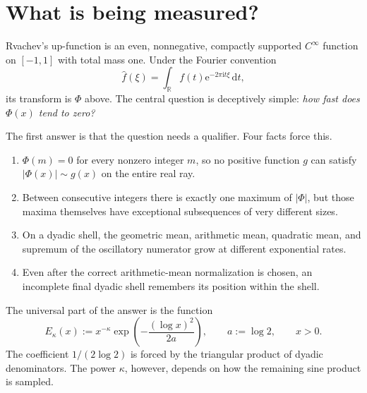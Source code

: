 \documentclass[11pt,oneside]{article}
\numberwithin{equation}{section}
\theoremstyle{definition}
\theoremstyle{remark}
\newcommand{\R}{\mathbb R}
\newcommand{\e}{\mathrm e}
\newcommand{\ii}{\mathrm i}
\newcommand{\dd}{\,\mathrm d}
\newcommand{\abs}[1]{\left|#1\right|}
\newcommand{\PhiUp}{\Phi}
\newcommand{\defeq}{\mathrel{:=}}
\newcommand{\fourier}[1]{\widehat{#1}}
\begin{document}
\tableofcontents
\newpage

\section{What is being measured?}
\label{sec:introduction}

Rvachev's up-function is an even, nonnegative, compactly supported \(C^\infty\) function
on \([-1,1]\) with total mass one.  Under the Fourier convention
\begin{equation}
 \fourier f(\xi)=\int_{\R}f(t)\e^{-2\pi\ii t\xi}\dd t,
 \label{eq:fourier-convention}
\end{equation}
its transform is \(\PhiUp\) above.  The central question is deceptively simple:
\emph{how fast does \(\PhiUp(x)\) tend to zero?}

The first answer is that the question needs a qualifier.  Four facts force this.
\begin{enumerate}
\item \(\PhiUp(m)=0\) for every nonzero integer \(m\), so no positive function \(g\) can
      satisfy \(\abs{\PhiUp(x)}\sim g(x)\) on the entire real ray.
\item Between consecutive integers there is exactly one maximum of \(\abs{\PhiUp}\), but
      those maxima themselves have exceptional subsequences of very different sizes.
\item On a dyadic shell, the geometric mean, arithmetic mean, quadratic mean, and supremum
      of the oscillatory numerator grow at different exponential rates.
\item Even after the correct arithmetic-mean normalization is chosen, an incomplete final
      dyadic shell remembers its position within the shell.
\end{enumerate}

The universal part of the answer is the function
\begin{equation}
 E_\kappa(x)
 \defeq x^{-\kappa}\exp\!\left(-\frac{(\log x)^2}{2a}\right),
 \qquad a\defeq\log2,
 \qquad x>0.
 \label{eq:E-kappa}
\end{equation}
The coefficient \(1/(2\log2)\) is forced by the triangular product of dyadic denominators.
The power \(\kappa\), however, depends on how the remaining sine product is sampled.
\end{document}
